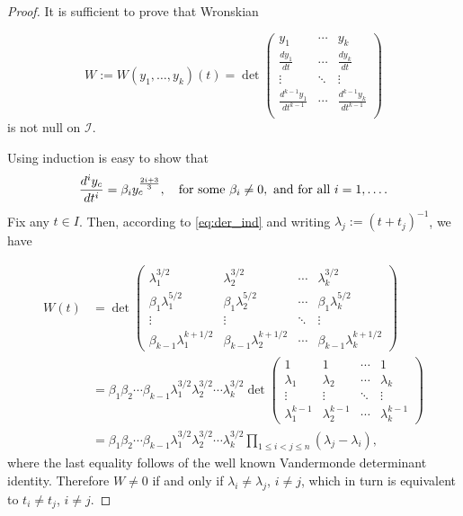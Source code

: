 \documentclass[twoside]{article}
\theoremstyle{remark}
\begin{document}
\begin{proof} It is sufficient to prove that Wronskian

 \[W:=W(y_1,\ldots,y_k)(t)=\det\begin{pmatrix}
			      y_1 & \cdots & y_k\\
			      \frac{dy_1}{dt}&  \cdots & \frac{dy_k}{dt}\\
			      \vdots & \ddots & \vdots \\
			      \frac{d^{k-1}y_1}{dt^{k-1}}&  \cdots & \frac{d^{k-1}y_k}{dt^{k-1}}\\
                           \end{pmatrix}
\]
is not null on $\mathcal{I}$.

Using induction is easy to show that
\begin{equation}\label{eq:der_ind}\frac{d^iy_c}{dt^i}=\beta_{i}y_{c}^{\frac{2i+3}{3}},\quad\hbox{for some }\beta_{i}\neq 0, \hbox{ and for all }i=1,\ldots.
\end{equation}
Fix any $t\in I$. Then, according to \eqref{eq:der_ind} and writing $\lambda_j:=(t+t_j)^{-1}$, we have

\[
\begin{split}
  W(t)&=\det
    \begin{pmatrix}
      \lambda_1^{3/2} & \lambda_2^{3/2} &\cdots & \lambda_k^{3/2} \\
      \beta_1\lambda_1^{5/2} &\beta_1 \lambda_2^{5/2} &\cdots &\beta_1 \lambda_k^{5/2}\\
      \vdots & \vdots &\ddots & \vdots\\
      \beta_{k-1}\lambda_1^{k+1/2} & \beta_{k-1}\lambda_2^{k+1/2} &\cdots & \beta_{k-1}\lambda_k^{k+1/2}
    \end{pmatrix}
  \\
  &= \beta_1\beta_2\cdots\beta_{k-1} \lambda_1^{3/2}\lambda_2^{3/2}\cdots \lambda_k^{3/2}
     \det \begin{pmatrix}
      1& 1 &\cdots & 1 \\
      \lambda_1 & \lambda_2 &\cdots & \lambda_k\\
      \vdots & \vdots &\ddots & \vdots\\
      \lambda_1^{k-1} & \lambda_2^{k-1} &\cdots & \lambda_k^{k-1}
    \end{pmatrix}
  \\
  &= \beta_1\beta_2\cdots\beta_{k-1} \lambda_1^{3/2}\lambda_2^{3/2}\cdots \lambda_k^{3/2}
  \prod_{1\leq i<j\leq n}(\lambda_j-\lambda_i)
,
\end{split}
\]
where the last equality follows of the well known Vandermonde determinant identity. Therefore $W\neq 0$ if and only if $\lambda_i\neq\lambda_j$, $i\neq j$,
which in turn is equivalent to $t_i\neq t_j$, $i\neq j$.
\end{proof}
\end{document}
